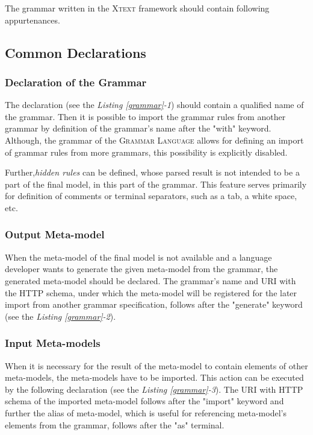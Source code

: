 \documentclass[12pt,notitlepage,a4paper]{report}
\begin{document}
The grammar written in the \textsc{Xtext} framework should contain following appurtenances.

\subsection{Common Declarations}

\subsubsection{Declaration of the Grammar}
The declaration (see the \textit{Listing \ref{grammar}-1}) should contain a qualified name of the grammar. Then it is possible to import the grammar rules from another grammar by definition of the grammar's name after the "with" keyword. Although, the grammar of the \textsc{Grammar Language} allows for defining an import of grammar rules from more grammars, this possibility is explicitly disabled.

Further,\textit{hidden rules}  can be defined, whose parsed result is not intended to be a part of the final model, in this part of the grammar. This feature serves primarily for definition of comments or terminal separators, such as a tab, a white space, etc.

\subsubsection{Output Meta-model}
When the meta-model of the final model is not available and a language developer wants to generate the given meta-model from the grammar, the generated meta-model should be declared. The grammar's name and URI \cite{URI} with the HTTP schema, under which the meta-model will be registered for the later import from another grammar specification, follows after the "generate" keyword (see the \textit{Listing \ref{grammar}-2}).

\subsubsection{Input Meta-models}
When it is necessary for the result of the meta-model to contain elements of other meta-models, the meta-models have to be imported. This action can be executed by the following declaration (see the \textit{Listing \ref{grammar}-3}). The URI with HTTP schema of the imported meta-model follows after the "import" keyword and further the alias of meta-model, which is useful for referencing meta-model's elements from the grammar, follows after the "as" terminal. 
\end{document}
